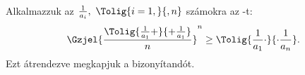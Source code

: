 Alkalmazzuk az $\frac{1}{a_{i}},\ \Tolig{i=1,}{,n}$ számokra az -t:
$$
\Gzjel{\frac{ \Tolig{\frac{1}{a_{1}}+}{+\frac{1}{a_{1}}} }{n} }^{n} \ge 
\Tolig{\frac{1}{a_{1}}\cdot}{\cdot \frac{1}{a_{n}}}.
$$
Ezt átrendezve megkapjuk a bizonyítandót.
